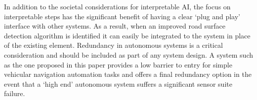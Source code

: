\documentclass[]{aiaa-tc}%
\begin{document}
In addition to the societal considerations for interpretable AI, the focus on interpretable steps has the significant benefit of having a clear `plug and play' interface with other systems. As a result, when an improved road surface detection algorithm is identified it can easily be integrated to the system in place of the existing element. Redundancy in autonomous systems is a critical consideration and should be included as part of any system design. A system such as the one proposed in this paper provides a low barrier to entry for simple vehicular navigation automation tasks and offers a final redundancy option in the event that a `high end' autonomous system suffers a significant sensor suite failure.



\end{document}
